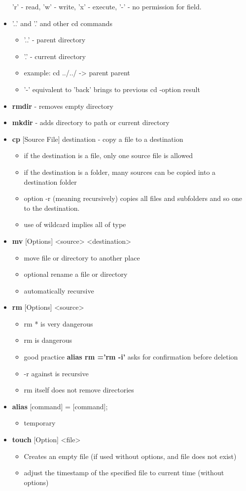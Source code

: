 \documentclass{article}
\begin{document}
\begin{itemize}
  'r' - read, 'w' - write, 'x' - execute, '-' - no permission for field.
  \item '..' and '.' and other cd commands
  \begin{itemize}
    \item '..' - parent directory
    \item '.' - current directory
    \item example: cd ../../ -> parent parent
    \item '-' equivalent to 'back' brings to previous cd -option result
  \end{itemize}
  \item \textbf{rmdir} - removes empty directory
  \item \textbf{mkdir} - adds directory to path or current directory
  \item \textbf{cp} [Source File] destination - copy a file to a destination
  \begin{itemize}
    \item if the destination is a file, only one source file is allowed
    \item if the destination is a folder, many sources can be copied into a destination folder
    \item option -r (meaning recursively) copies all files and subfolders and so one to the destination.
    \item use of wildcard implies all of type
  \end{itemize}
  \item \textbf{mv} [Options] <source> <destination>
  \begin{itemize}
    \item move file or directory to another place
    \item optional rename a file or directory
    \item automatically recursive
  \end{itemize}
  \item \textbf{rm} [Options] <source>
  \begin{itemize}
    \item rm * is very dangerous
    \item rm is dangerous
    \item good practice \textbf{alias rm ='rm -i'} asks for confirmation before deletion
    \item -r against is recursive
    \item rm itself does not remove directories
  \end{itemize}
  \item \textbf{alias} [command] = [command];
  \begin{itemize}
    \item temporary
  \end{itemize}
  \item \textbf{touch} [Option] <file>
  \begin{itemize}
    \item Creates an empty file (if used without options, and file does not exist)
    \item adjust the timestamp of the specified file to current time (without options)
  \end{itemize}
\end{itemize}
\end{document}
